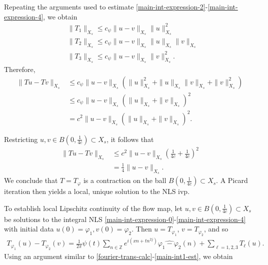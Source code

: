 \documentclass[handout]{beamer}
\numberwithin{equation}{section}
\newcommand{\zz}{\mathbb{Z}}
\newcommand{\wh}{\widehat}
\newcommand{\vp}{\varphi}
\begin{document}
\begin{frame}
Repeating the arguments used to estimate 
\eqref{main-int-expression-2}-\eqref{main-int-expression-4}, we obtain
%
\begin{equation*}
	\begin{split}
		& \|T_1\|_{X_s} \le c_\psi \|u -v \|_{X_s} \|u\|^2_{X_s}
		\\
		& \|T_2\|_{X_s} \le c_\psi \|u -v \|_{X_s} \|u\|_{X_s} \|v\|_{X_s}
		\\
		& \|T_3\|_{X_s} \le c_\psi \|u -v \|_{X_s} \|v\|_{X_s}^2.
	\end{split}
\end{equation*}
%
Therefore,
%
\begin{equation*}
	\begin{split}
		\|Tu - Tv \|_{X_s}
		& \le c_\psi \|u -v \|_{X_s} \left( \|u\|_{X_s}^2 + 
		\|u\|_{X_s} \|v\|_{X_s} + \|v\|_{X_s}^2 \right)
		\\
		& \le c_\psi \|u -v\|_{X_s} \left( \|u\|_{X_s} + \|v\|_{X_s} \right)^2
		\\
		& = c^2 \|u -v\|_{X_s} \left( \|u\|_{X_s} + \|v\|_{X_s} \right)^2.
	\end{split}
\end{equation*}

\end{frame}
%

\begin{frame}

Restricting $u, v \in B(0, \frac{1}{4c}) \subset X_s$, it follows that
%
\begin{equation*}
	\begin{split}
		\|Tu - Tv \|_{X_s}
		& \le c^2 \|u -v \|_{X_s} \left( \frac{1}{4c} + 
		\frac{1}{4c} \right)^2
		\\
		& = \frac{1}{4} \|u -v \|_{X_s}. 
	\end{split}
\end{equation*}
%
We conclude that $T = T_{\vp}$ is a contraction on the ball $B(0, 
\frac{1}{4c}) \subset X_s$. A Picard iteration then yields a local, unique
solution to the NLS ivp.
\end{frame}

\begin{frame}
	To establish local Lipschitz continuity of the flow map, let $u, v \in B(0,
\frac{1}{4c}) \subset X_s$ be solutions to
the integral NLS \eqref{main-int-expression-0}-\eqref{main-int-expression-4}
with initial data $u(0) = \vp_1, v(0) =
\vp_{2}$. Then $u = T_{\vp_1}$, $v = T_{\vp_2}$, and so
%
%
\begin{equation*}
	\begin{split}
		T_{\vp_1}(u) - T_{\vp_2}(v) = \frac{1}{2\pi} \psi(t) \sum_{n \in
		\zz}e^{i\left( xn + tn^{2j} \right)} \wh{\vp_1 - \vp_2}(n) + \sum_{\ell
		= 1,2,3} T_{\ell}(u).
	\end{split}
\end{equation*}
%
%
Using an argument similar to \eqref{fourier-trans-calc}-\eqref{main-int1-est},
we obtain
%
%
\end{frame}
\end{document}
